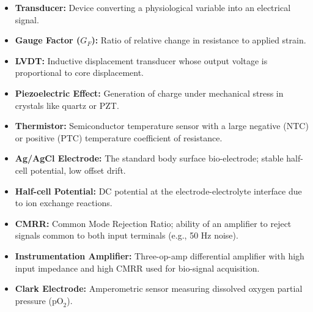 \documentclass[12pt,a4paper]{article}
\begin{document}
\begin{tcolorbox}[defbox, title={\textbf{One-Line Definitions}}]
\begin{itemize}[leftmargin=*, itemsep=2.5pt, topsep=0pt]
  \item \textbf{Transducer:} Device converting a physiological variable into an electrical signal.
  \item \textbf{Gauge Factor ($G_F$):} Ratio of relative change in resistance to applied strain.
  \item \textbf{LVDT:} Inductive displacement transducer whose output voltage is proportional to core displacement.
  \item \textbf{Piezoelectric Effect:} Generation of charge under mechanical stress in crystals like quartz or PZT.
  \item \textbf{Thermistor:} Semiconductor temperature sensor with a large negative (NTC) or positive (PTC) temperature coefficient of resistance.
  \item \textbf{Ag/AgCl Electrode:} The standard body surface bio-electrode; stable half-cell potential, low offset drift.
  \item \textbf{Half-cell Potential:} DC potential at the electrode-electrolyte interface due to ion exchange reactions.
  \item \textbf{CMRR:} Common Mode Rejection Ratio; ability of an amplifier to reject signals common to both input terminals (e.g., 50 Hz noise).
  \item \textbf{Instrumentation Amplifier:} Three-op-amp differential amplifier with high input impedance and high CMRR used for bio-signal acquisition.
  \item \textbf{Clark Electrode:} Amperometric sensor measuring dissolved oxygen partial pressure ($\text{pO}_2$).
\end{itemize}
\end{tcolorbox}
\end{document}
